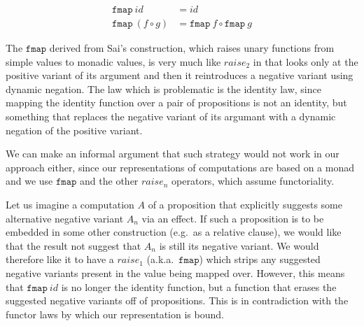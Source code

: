 \documentclass[a4paper,11pt,DIV=12]{scrartcl}
\newcommand{\hsbind}{\mathbin{\texttt{>>=}}}
\begin{document}
\begin{align*}
  \texttt{fmap}\ id &= id \\
  \texttt{fmap}\ (f \circ g) &= \texttt{fmap}\ f \circ \texttt{fmap}\ g
\end{align*}

The $\texttt{fmap}$ derived from Sai's construction, which raises unary
functions from simple values to monadic values, is very much like $raise_2$
in that looks only at the positive variant of its argument and then it
reintroduces a negative variant using dynamic negation. The law which is
problematic is the identity law, since mapping the identity function over a
pair of propositions is not an identity, but something that replaces the
negative variant of its argumant with a dynamic negation of the positive
variant.

We can make an informal argument that such strategy would not work in our
approach either, since our representations of computations are based on a
monad and we use $\texttt{fmap}$ and the other $raise_n$ operators, which
assume functoriality.

Let us imagine a computation $A$ of a proposition that explicitly suggests
some alternative negative variant $A_n$ via an effect. If such a
proposition is to be embedded in some other construction (e.g.\ as a
relative clause), we would like that the result not suggest that $A_n$ is
still its negative variant. We would therefore like it to have a $raise_1$
(a.k.a.\ $\texttt{fmap}$) which strips any suggested negative variants
present in the value being mapped over. However, this means that
$\texttt{fmap}\ id$ is no longer the identity function, but a function that
erases the suggested negative variants off of propositions. This is in
contradiction with the functor laws by which our representation is bound.




\end{document}
